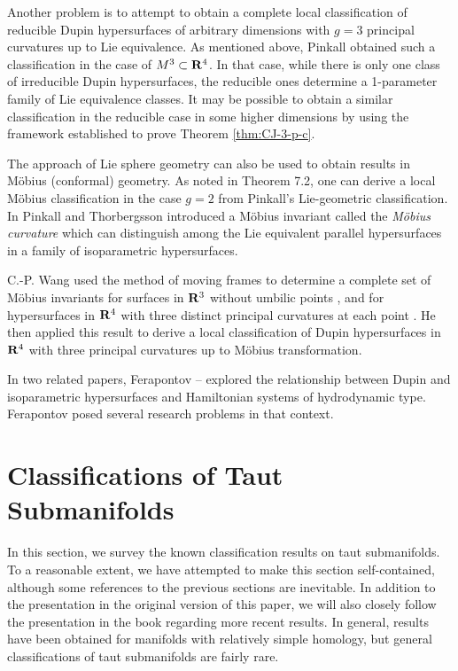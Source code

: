 \documentclass[12pt]{article}
\begin{document}
{Another problem is to attempt to obtain a complete local
classification of reducible Dupin hypersurfaces of arbitrary dimensions
with $g=3$ principal curvatures up to Lie equivalence. 
As mentioned above, Pinkall obtained such a classification in the 
case of $M^3 \subset {\bf R}^4$.  In that case, while there is only
one class of irreducible Dupin hypersurfaces, the reducible ones 
determine a 1-parameter family of Lie equivalence classes.  It may be
possible to obtain a similar classification in the reducible case in some higher dimensions
by using the framework established
to prove Theorem \ref{thm:CJ-3-p-c}.

The approach of Lie sphere geometry can also be used
to obtain results in M\"{o}bius (conformal) geometry.  As noted in
Theorem 7.2,
one can derive a local M\"{o}bius classification in the case $g=2$
from Pinkall's Lie-geometric classification.  In \cite{PT}
Pinkall and Thorbergsson introduced a M\"{o}bius invariant called
the {\em M\"{o}bius curvature} which can distinguish among the Lie
equivalent parallel hypersurfaces in a family of isoparametric
hypersurfaces.  

C.-P. Wang used the method
of moving frames to determine a complete
set of M\"{o}bius invariants for surfaces in ${\bf R}^3$ without
umbilic points \cite{Wc}, and for hypersurfaces in ${\bf R}^4$
with three distinct principal curvatures at each point \cite{Wc1}.
He then applied this result to derive a local
classification of Dupin hypersurfaces in ${\bf R}^4$ with three
principal curvatures
up to M\"{o}bius transformation.  

In two related papers, Ferapontov \cite{Fera}--\cite{Fera1} 
explored the
relationship between Dupin and 
isoparametric hypersurfaces and Hamiltonian
systems of hydrodynamic type.  Ferapontov posed several research
problems in that context. \\

\section{Classifications of Taut Submanifolds}
\label{sec:classifications-taut-submanifolds}

In this section, we survey the known classification results
on taut submanifolds.  To a reasonable extent, we have attempted to 
make this section self-contained, although some references
to the previous sections are inevitable.  In addition to the presentation in the
original version of this paper, 
we will also closely follow the presentation in the book
\cite[pp. 327--342]{CR8} regarding more recent results. 
In general, results have been obtained for manifolds with relatively 
simple homology, but general classifications of taut submanifolds are fairly rare.

}
\end{document}
